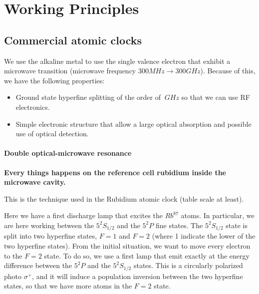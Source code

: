 \section{Working Principles}
\label{sec:working_principles}

\subsection{Commercial atomic clocks}
\label{sub:commercial_atomic_clocks}

We use the alkaline metal to use the single valence electron that exhibit a microwave transition (microwave frequency $300MHz \rightarrow 300GHz$).
Because of this, we have the following properties:

\begin{itemize}
    \item Ground state hyperfine splitting of the order of $~GHz$ so that we can use RF electronics.
    \item Simple electronic structure that allow a large optical absorption and possible use of optical detection.
\end{itemize}

\paragraph{Double optical-microwave resonance}

\textbf{Every things happens on the reference cell rubidium inside the microwave cavity.}

This is the technique used in the Rubidium atomic clock (table scale at least).

Here we have a first discharge lamp that excites the $Rb^{87}$ atoms.
In particular, we are here working between the $5^2S_{1/2}$ and the $5^2P$ fine states.
The $5^2S_{1/2}$ state is split into two hyperfine states, $F=1$ and $F=2$ (where 1 indicate the lower of the two hyperfine states).
From the initial situation, we want to move every electron to the $F=2$ state.
To do so, we use a first lamp that emit exactly at the energy difference between the $5^2P$ and the $5^2S_{1/2}$ states.
This is a circularly polarized photo $\sigma^+$, and it will induce a population inversion between the two hyperfine states, so that we have more atoms in the $F=2$ state.


